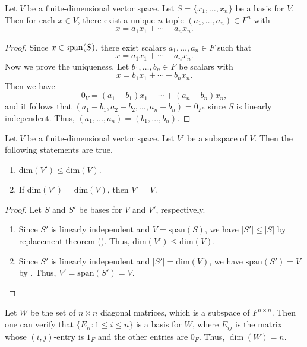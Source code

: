 \begin{proposition}\label{prop:unique-coordinate}
  Let $V$ be a finite-dimensional vector space.
  Let $S = \{x_1, \dots, x_n\}$ be a basis for $V$.
  Then for each $x \in V$, there exist a unique $n$-tuple
  $(a_1, \dots, a_n) \in F^n$ with
  \begin{equation*}
    x = a_1x_1 + \cdots + a_nx_n.
  \end{equation*}
\end{proposition}
\begin{proof}
  Since $x \in \operatorname{span}(S)$, there exist scalars $a_1, \dots, a_n \in F$ such that
  \begin{equation*}
    x = a_1x_1 + \cdots + a_nx_n.
  \end{equation*}
  Now we prove the uniqueness.
  Let $b_1, \dots, b_n \in F$ be scalars with
  \begin{equation*}
    x = b_1x_1 + \cdots + b_nx_n.
  \end{equation*}
  Then we have
  \begin{equation*}
    0_V = (a_1 - b_1)x_1 + \cdots + (a_n - b_n)x_n,
  \end{equation*}
  and it follows that $(a_1 - b_1, a_2 - b_2, \dots, a_n - b_n) = 0_{F^n}$
  since $S$ is linearly independent.
  Thus, $(a_1, \dots, a_n) = (b_1, \dots, b_n)$.
\end{proof}

\begin{proposition}\label{prop:subspace-dimension}
  Let $V$ be a finite-dimensional vector space.
  Let $V'$ be a subspace of $V$.
  Then the following statements are true.
  \begin{enumerate}
    \item $\mathrm{dim}(V') \leq \mathrm{dim}(V)$.
    \item If $\mathrm{dim}(V') = \mathrm{dim}(V)$, then $V' = V$.
  \end{enumerate}
\end{proposition}
\begin{proof}
  Let $S$ and $S'$ be bases for $V$ and $V'$, respectively.
  \begin{enumerate}
    \item Since $S'$ is linearly independent and $V = \mathrm{span}(S)$,
      we have $|S'| \leq |S|$ by replacement theorem ().
      Thus, $\mathrm{dim}(V') \leq \mathrm{dim}(V)$.
    \item Since $S'$ is linearly independent and $|S'| = \mathrm{dim}(V)$,
      we have $\mathrm{span}(S') = V$ by .
      Thus, $V' = \mathrm{span}(S') = V$. \qedhere
  \end{enumerate}
\end{proof}

\begin{example}
  Let $W$ be the set of $n \times n$ diagonal matrices, which is a subspace of
  $F^{n \times n}$.
  Then one can verify that $\{E_{ii}: 1 \leq i \leq n\}$ is a basis for $W$,
  where $E_{ij}$ is the matrix whose $(i, j)$-entry is $1_F$ and the other
  entries are $0_F$.
  Thus, $\dim(W) = n$.
\end{example}